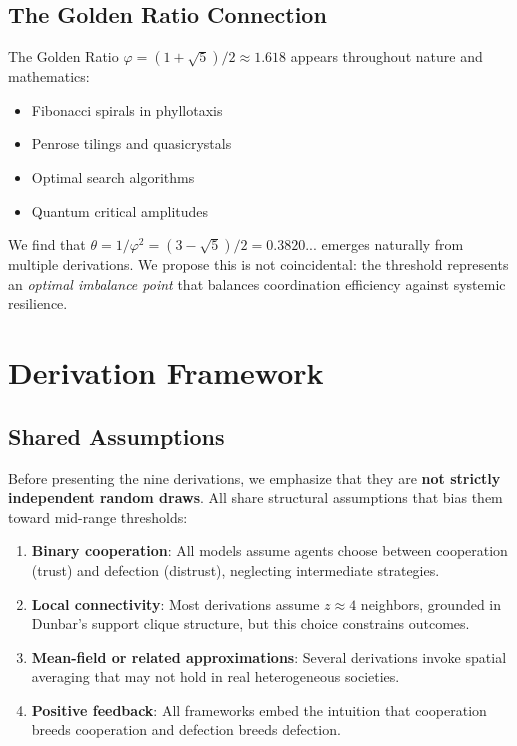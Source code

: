 \documentclass[11pt,twocolumn]{article}
\begin{document}
\subsection{The Golden Ratio Connection}

The Golden Ratio $\varphi = (1 + \sqrt{5})/2 \approx 1.618$ appears throughout nature and mathematics:
\begin{itemize}
\item Fibonacci spirals in phyllotaxis
\item Penrose tilings and quasicrystals
\item Optimal search algorithms
\item Quantum critical amplitudes
\end{itemize}

We find that $\theta = 1/\varphi^2 = (3-\sqrt{5})/2 = 0.3820...$ emerges naturally from multiple derivations. We propose this is not coincidental: the threshold represents an \emph{optimal imbalance point} that balances coordination efficiency against systemic resilience.

\section{Derivation Framework}

\subsection{Shared Assumptions}

Before presenting the nine derivations, we emphasize that they are \textbf{not strictly independent random draws}. All share structural assumptions that bias them toward mid-range thresholds:

\begin{enumerate}
\item \textbf{Binary cooperation}: All models assume agents choose between cooperation (trust) and defection (distrust), neglecting intermediate strategies.
\item \textbf{Local connectivity}: Most derivations assume $z \approx 4$ neighbors, grounded in Dunbar's support clique structure, but this choice constrains outcomes.
\item \textbf{Mean-field or related approximations}: Several derivations invoke spatial averaging that may not hold in real heterogeneous societies.
\item \textbf{Positive feedback}: All frameworks embed the intuition that cooperation breeds cooperation and defection breeds defection.
\end{enumerate}
\end{document}
